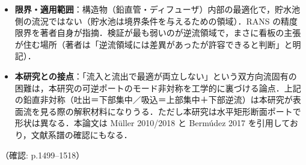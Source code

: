 \documentclass[11pt]{jsarticle}
\begin{document}
\begin{itemize}
\begin{itemize}
  \end{itemize}
  \item \textbf{限界・適用範囲}：構造物（鉛直管・ディフューザ）内部の最適化で，貯水池側の流況ではない（貯水池は境界条件を与えるための領域）．RANS の精度限界を著者自身が指摘．検証が最も弱いのが逆流領域で，まさに看板の主張が住む場所（著者は「逆流領域には差異があったが許容できると判断」と明記）．
  \item \textbf{本研究との接点}：「流入と流出で最適が両立しない」という双方向流固有の困難は，本研究の可逆ポートのモード非対称を工学的に裏づける論点．上記の鉛直非対称（吐出＝下部集中／吸込＝上部集中＋下部逆流）は本研究が表面流を見る際の解釈材料になりうる．ただし本研究は水平矩形断面ポートで形状は異なる．本論文は M\"uller 2010/2018 と Berm\'udez 2017 を引用しており，文献系譜の確認にもなる．
\end{itemize}
\noindent（確認: p.1499--1518）
\end{document}
